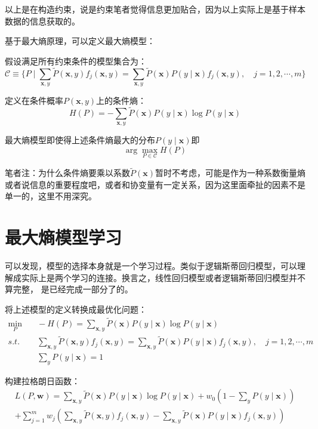 \documentclass{article}
\begin{document}
        以上是在构造约束，说是约束笔者觉得信息更加贴合，因为以上实际上是基于样本数据的信息获取的。

        基于最大熵原理，可以定义最大熵模型：

        假设满足所有约束条件的模型集合为：
        \[\mathcal{C} \equiv \{P\mid\sum_{\boldsymbol{x},y}\widetilde{P}(\boldsymbol{x},y)f_j(\boldsymbol{x},y)=\sum_{\boldsymbol{x},y}\widetilde{P}(\boldsymbol{x})P(y\mid\boldsymbol{x})f_j(\boldsymbol{x},y),\quad j=1,2,\cdots,m\}\]
        
        定义在条件概率$P(\boldsymbol{x},y)$上的条件熵：
        \[H(P)=-\sum_{\boldsymbol{x},y}\widetilde{P}(\boldsymbol{x})P(y\mid\boldsymbol{x})\log P(y\mid\boldsymbol{x})\]

        最大熵模型即使得上述条件熵最大的分布$P(y\mid\boldsymbol{x})$即
        \[\arg\max_{P\in\mathcal{C}}H(P)\]

        笔者注：为什么条件熵要乘以系数$\widetilde{P}(\boldsymbol{x})$暂时不考虑，可能是作为一种系数衡量熵或者说信息的重要程度吧，或者和协变量有一定关系，因为这里面牵扯的因素不是单一的，这里不用深究。

    \section{最大熵模型学习}
        可以发现，模型的选择本身就是一个学习过程。类似于逻辑斯蒂回归模型，可以理解成实际上是两个学习的连接。换言之，线性回归模型或者逻辑斯蒂回归模型并不算完整，
        是已经完成一部分了的。

        将上述模型的定义转换成最优化问题：
        \begin{align*}
            \min_{P}& \quad -H(P)=\sum_{\boldsymbol{x},y}\widetilde{P}(\boldsymbol{x})P(y\mid\boldsymbol{x})\log P(y\mid\boldsymbol{x})\\
            s.t. &\quad \sum_{\boldsymbol{x},y}\widetilde{P}(\boldsymbol{x},y)f_j(\boldsymbol{x},y)=\sum_{\boldsymbol{x},y}\widetilde{P}(\boldsymbol{x})P(y\mid\boldsymbol{x})f_j(\boldsymbol{x},y),\quad j=1,2,\cdots,m\\
            & \quad \sum_{y}P(y\mid\boldsymbol{x})=1
        \end{align*}

        构建拉格朗日函数：
        \begin{align*}
        L(P,\boldsymbol{w})=\sum_{\boldsymbol{x},y}\widetilde{P}(\boldsymbol{x})P(y\mid\boldsymbol{x})\log P(y\mid\boldsymbol{x})+w_0(1-\sum_{y}P(y\mid\boldsymbol{x})) \\+\sum_{j=1}^{m}w_j(\sum_{\boldsymbol{x},y}\widetilde{P}(\boldsymbol{x},y)f_j(\boldsymbol{x},y)-\sum_{\boldsymbol{x},y}\widetilde{P}(\boldsymbol{x})P(y\mid\boldsymbol{x})f_j(\boldsymbol{x},y))
        \end{align*}
\end{document}
